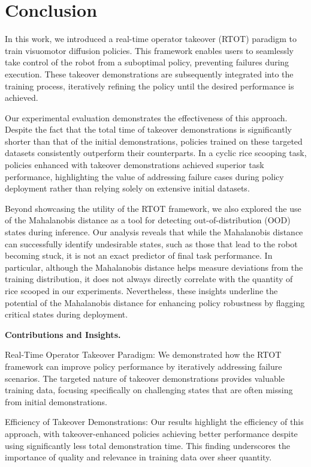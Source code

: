 

\section{Conclusion}

In this work, we introduced a real-time operator takeover (RTOT) paradigm to train visuomotor diffusion policies. This framework enables users to seamlessly take control of the robot from a suboptimal policy, preventing failures during execution. These takeover demonstrations are subsequently integrated into the training process, iteratively refining the policy until the desired performance is achieved.

Our experimental evaluation demonstrates the effectiveness of this approach. Despite the fact that the total time of takeover demonstrations is significantly shorter than that of the initial demonstrations, policies trained on these targeted datasets consistently outperform their counterparts. In a cyclic rice scooping task, policies enhanced with takeover demonstrations achieved superior task performance, highlighting the value of addressing failure cases during policy deployment rather than relying solely on extensive initial datasets.

Beyond showcasing the utility of the RTOT framework, we also explored the use of the Mahalanobis distance as a tool for detecting out-of-distribution (OOD) states during inference. Our analysis reveals that while the Mahalanobis distance can successfully identify undesirable states, such as those that lead to the robot becoming stuck, it is not an exact predictor of final task performance. In particular, although the Mahalanobis distance helps measure deviations from the training distribution, it does not always directly correlate with the quantity of rice scooped in our experiments. Nevertheless, these insights underline the potential of the Mahalanobis distance for enhancing policy robustness by flagging critical states during deployment.

\textbf{Contributions and Insights.}

Real-Time Operator Takeover Paradigm: We demonstrated how the RTOT framework can improve policy performance by iteratively addressing failure scenarios. The targeted nature of takeover demonstrations provides valuable training data, focusing specifically on challenging states that are often missing from initial demonstrations.

Efficiency of Takeover Demonstrations: Our results highlight the efficiency of this approach, with takeover-enhanced policies achieving better performance despite using significantly less total demonstration time. This finding underscores the importance of quality and relevance in training data over sheer quantity.


